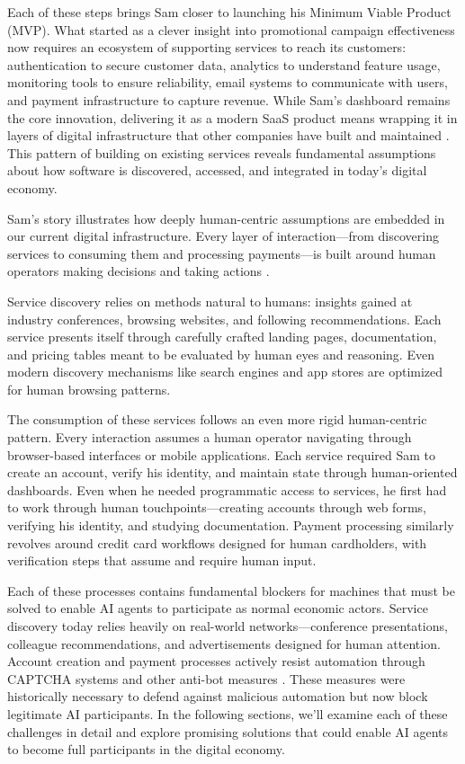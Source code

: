 \documentclass{article}
\begin{document}
Each of these steps brings Sam closer to launching his Minimum Viable Product (MVP). What started as a clever insight into promotional campaign effectiveness now requires an ecosystem of supporting services to reach its customers: authentication to secure customer data, analytics to understand feature usage, monitoring tools to ensure reliability, email systems to communicate with users, and payment infrastructure to capture revenue. While Sam's dashboard remains the core innovation, delivering it as a modern SaaS product means wrapping it in layers of digital infrastructure that other companies have built and maintained \cite{brynjolfsson2011race}. This pattern of building on existing services reveals fundamental assumptions about how software is discovered, accessed, and integrated in today's digital economy.

Sam's story illustrates how deeply human-centric assumptions are embedded in our current digital infrastructure. Every layer of interaction—from discovering services to consuming them and processing payments—is built around human operators making decisions and taking actions \cite{dix2004human}.

Service discovery relies on methods natural to humans: insights gained at industry conferences, browsing websites, and following recommendations. Each service presents itself through carefully crafted landing pages, documentation, and pricing tables meant to be evaluated by human eyes and reasoning. Even modern discovery mechanisms like search engines and app stores are optimized for human browsing patterns.

The consumption of these services follows an even more rigid human-centric pattern. Every interaction assumes a human operator navigating through browser-based interfaces or mobile applications. Each service required Sam to create an account, verify his identity, and maintain state through human-oriented dashboards. Even when he needed programmatic access to services, he first had to work through human touchpoints—creating accounts through web forms, verifying his identity, and studying documentation. Payment processing similarly revolves around credit card workflows designed for human cardholders, with verification steps that assume and require human input.

Each of these processes contains fundamental blockers for machines that must be solved to enable AI agents to participate as normal economic actors. Service discovery today relies heavily on real-world networks—conference presentations, colleague recommendations, and advertisements designed for human attention. Account creation and payment processes actively resist automation through CAPTCHA systems\cite{singh2014survey} and other anti-bot measures \cite{douceur2002sybil}. These measures were historically necessary to defend against malicious automation but now block legitimate AI participants. In the following sections, we'll examine each of these challenges in detail and explore promising solutions that could enable AI agents to become full participants in the digital economy.
\end{document}
